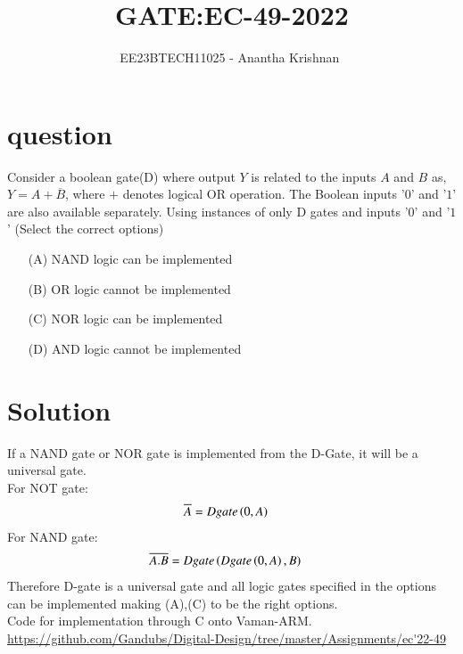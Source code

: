 \documentclass[journal,12pt,onecolumn]{IEEEtran}
\theoremstyle{remark}
\begin{document}

\vspace{3cm}

\title{GATE:EC-49-2022}
\author{EE23BTECH11025 - Anantha Krishnan $^{}$%
}
\maketitle
\bigskip



\section{question}
Consider a boolean gate(D) where output $Y$ is related to the inputs $A$ and $B$ as, $Y = A + \overline{B}$, where $+$ denotes logical OR operation. The Boolean inputs '$0$' and '$1$' are also available separately. Using instances of only D gates and inputs '$0$' and '$1$' (Select the correct options)
\begin{enumerate}
    \item [(A)] NAND logic can be implemented
    \item [(B)] OR logic cannot be implemented 
    \item [(C)] NOR logic can be implemented
    \item [(D)] AND logic cannot be implemented
\end{enumerate}

\section{Solution}
If a NAND gate or NOR gate is implemented from the D-Gate, it will be a universal gate.\\
For NOT gate:
\begin{align}
    \overline{A} &= Dgate\left(0,A\right)
\end{align}
For NAND gate:
\begin{align}
    \overline{A.B} &= Dgate\left(Dgate\left(0,A\right),B\right)
\end{align}
Therefore D-gate is a universal gate and all logic gates specified in the options can be implemented making (A),(C) to be the right options.\\
Code for implementation through C onto Vaman-ARM.\\
\url{https://github.com/Gandubs/Digital-Design/tree/master/Assignments/ec'22-49}
 
\end{document}
